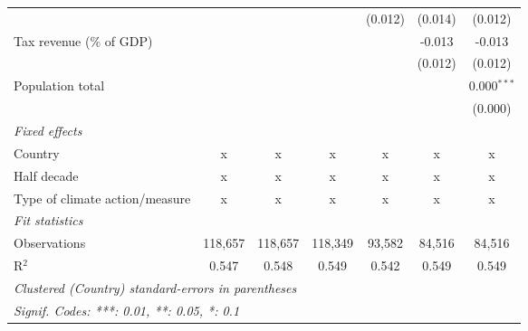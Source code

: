 \begin{tabular}{lcccccc}
                                                        &         &               &               & (0.012)        & (0.014)        & (0.012)\\   
   Tax revenue (\% of GDP)                              &         &               &               &                & -0.013         & -0.013\\   
                                                        &         &               &               &                & (0.012)        & (0.012)\\   
   Population total                                     &         &               &               &                &                & 0.000$^{***}$\\   
                                                        &         &               &               &                &                & (0.000)\\   
   \emph{Fixed effects}\\
   Country                                              & x       & x             & x             & x              & x              & x\\  
   Half decade                                          & x       & x             & x             & x              & x              & x\\  
   Type of climate action/measure                       & x       & x             & x             & x              & x              & x\\  
   \midrule \emph{Fit statistics}\\
   Observations                                         & 118,657 & 118,657       & 118,349       & 93,582         & 84,516         & 84,516\\  
   R$^2$                                                & 0.547   & 0.548         & 0.549         & 0.542          & 0.549          & 0.549\\  
   \midrule
   \multicolumn{7}{l}{\emph{Clustered (Country) standard-errors in parentheses}}\\
   \multicolumn{7}{l}{\emph{Signif. Codes: ***: 0.01, **: 0.05, *: 0.1}}\\
\end{tabular}
\par\endgroup


